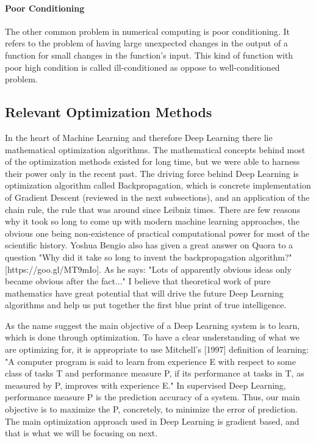 \documentclass[paper=a4, fontsize=11pt]{scrartcl}
\numberwithin{equation}{section}		%
\numberwithin{figure}{section}			%
\numberwithin{table}{section}			%
\begin{document}
	\paragraph{Poor Conditioning}  
	The other common problem in numerical computing is poor conditioning. It refers to the problem of having large unexpected changes in the output of a function for small changes in the function's input. This kind of function with poor high condition is called ill-conditioned as oppose to well-conditioned problem.
	
	\subsection{Relevant Optimization Methods}
    In the heart of Machine Learning and therefore Deep Learning there lie mathematical optimization algorithms. The mathematical concepts behind most of the optimization methods existed for long time, but we were able to harness their power only in the recent past. The driving force behind Deep Learning is optimization algorithm called Backpropagation, which is concrete implementation of Gradient Descent (reviewed in the next subsections), and an application of the chain rule, the rule that was around since Leibniz times. There are few reasons why it took so long to come up with modern machine learning approaches, the obvious one being non-existence of practical computational power for most of the scientific history. Yoshua Bengio also has given a great answer on Quora to a question "Why did it take so long to invent the backpropagation algorithm?" [https://goo.gl/MT9mIo]. As he says: "Lots of apparently obvious ideas only became obvious after the fact..." I believe that theoretical work of pure mathematics have great potential that will drive the future Deep Learning algorithms and help us put together the first blue print of true intelligence.\par
    As the name suggest the main objective of a Deep Learning system is to learn, which is done through optimization. To have a clear understanding of what we are optimizing for, it is appropriate to use Mitchell's [1997] definition of learning: "A computer program is said to learn from experience E with respect to some class of tasks T and performance measure P, if its performance at tasks in T, as measured by P, improves with experience E." In supervised Deep Learning, performance measure P is the prediction accuracy of a system. Thus, our main objective is to maximize the P, concretely, to minimize the error of prediction. The main optimization approach used in Deep Learning is gradient based, and that is what we will be focusing on next.  
\end{document}
